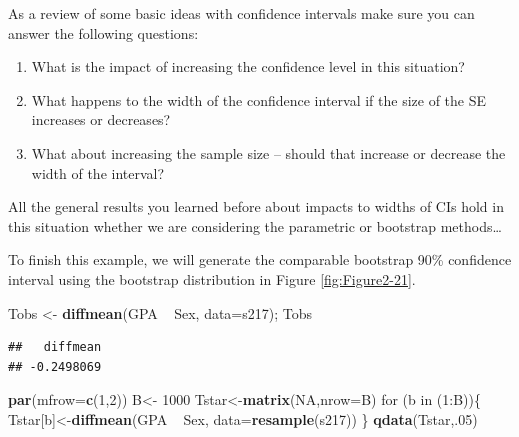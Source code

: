 \documentclass[]{book}
\newenvironment{Shaded}{\begin{snugshade}}{\end{snugshade}}
\newcommand{\KeywordTok}[1]{\textcolor[rgb]{0.13,0.29,0.53}{\textbf{{#1}}}}
\newcommand{\DataTypeTok}[1]{\textcolor[rgb]{0.13,0.29,0.53}{{#1}}}
\newcommand{\DecValTok}[1]{\textcolor[rgb]{0.00,0.00,0.81}{{#1}}}
\newcommand{\StringTok}[1]{\textcolor[rgb]{0.31,0.60,0.02}{{#1}}}
\newcommand{\OtherTok}[1]{\textcolor[rgb]{0.56,0.35,0.01}{{#1}}}
\newcommand{\NormalTok}[1]{{#1}}
\begin{document}
As a review of some basic ideas with confidence intervals make sure you
can answer the following questions:

\begin{enumerate}
\def\labelenumi{\arabic{enumi}.}
\item
  What is the impact of increasing the confidence level in this
  situation?
\item
  What happens to the width of the confidence interval if the size of
  the SE increases or decreases?
\item
  What about increasing the sample size -- should that increase or
  decrease the width of the interval?
\end{enumerate}

All the general results you learned before about impacts to widths of
CIs hold in this situation whether we are considering the parametric or
bootstrap methods\ldots{}

To finish this example, we will generate the comparable bootstrap 90\%
confidence interval using the bootstrap distribution in Figure
\ref{fig:Figure2-21}.

\begin{Shaded}
\begin{Highlighting}[]
\NormalTok{Tobs <-}\StringTok{ }\KeywordTok{diffmean}\NormalTok{(GPA ~}\StringTok{ }\NormalTok{Sex, }\DataTypeTok{data=}\NormalTok{s217); Tobs}
\end{Highlighting}
\end{Shaded}

\begin{verbatim}
##   diffmean 
## -0.2498069
\end{verbatim}

\begin{Shaded}
\begin{Highlighting}[]
\KeywordTok{par}\NormalTok{(}\DataTypeTok{mfrow=}\KeywordTok{c}\NormalTok{(}\DecValTok{1}\NormalTok{,}\DecValTok{2}\NormalTok{))}
\NormalTok{B<-}\StringTok{ }\DecValTok{1000}
\NormalTok{Tstar<-}\KeywordTok{matrix}\NormalTok{(}\OtherTok{NA}\NormalTok{,}\DataTypeTok{nrow=}\NormalTok{B)}
\NormalTok{for (b in (}\DecValTok{1}\NormalTok{:B))\{}
  \NormalTok{Tstar[b]<-}\KeywordTok{diffmean}\NormalTok{(GPA ~}\StringTok{ }\NormalTok{Sex, }\DataTypeTok{data=}\KeywordTok{resample}\NormalTok{(s217))}
  \NormalTok{\}}
\KeywordTok{qdata}\NormalTok{(Tstar,.}\DecValTok{05}\NormalTok{)}
\end{Highlighting}
\end{Shaded}
\end{document}

